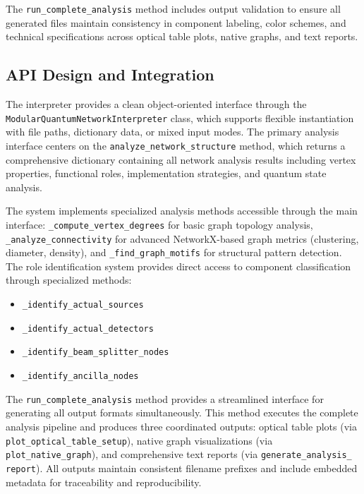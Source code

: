 \documentclass[11pt,a4paper]{article}
\begin{document}
The \texttt{run\_complete\_analysis} method includes output validation to ensure all generated files maintain consistency in component labeling, color schemes, and technical specifications across optical table plots, native graphs, and text reports.

\subsection{API Design and Integration}

The interpreter provides a clean object-oriented interface through the \texttt{Modular\-Quantum\-Network\-Interpreter} class, which supports flexible instantiation with file paths, dictionary data, or mixed input modes. The primary analysis interface centers on the \texttt{analyze\_network\_structure} method, which returns a comprehensive dictionary containing all network analysis results including vertex properties, functional roles, implementation strategies, and quantum state analysis.

The system implements specialized analysis methods accessible through the main interface: \texttt{\_compute\_vertex\_degrees} for basic graph topology analysis, \texttt{\_analyze\_connectivity} for advanced NetworkX-based graph metrics (clustering, diameter, density), and \texttt{\_find\_graph\_motifs} for structural pattern detection. The role identification system provides direct access to component classification through specialized methods:
\begin{itemize}
\item \texttt{\_identify\_actual\_sources}
\item \texttt{\_identify\_actual\_detectors}
\item \texttt{\_identify\_beam\_splitter\_nodes}
\item \texttt{\_identify\_ancilla\_nodes}
\end{itemize}

The \texttt{run\_complete\_analysis} method provides a streamlined interface for generating all output formats simultaneously. This method executes the complete analysis pipeline and produces three coordinated outputs: optical table plots (via \texttt{plot\_optical\_table\_setup}), native graph visualizations (via \texttt{plot\_native\_graph}), and comprehensive text reports (via \texttt{generate\_analysis\_\\report}). All outputs maintain consistent filename prefixes and include embedded metadata for traceability and reproducibility.
\end{document}
